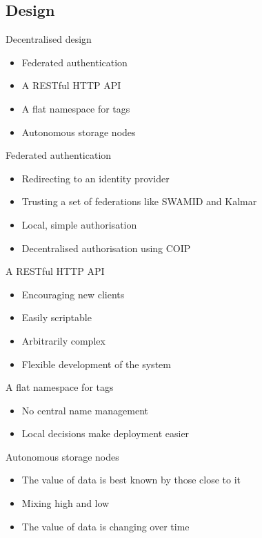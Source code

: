 \documentclass{beamer}
\begin{document}
\subsection{Design}
\begin{frame}{Decentralised design}
  \begin{itemize}
  \item
    Federated authentication
  \item
    A RESTful HTTP API
  \item
    A flat namespace for tags
  \item
    Autonomous storage nodes 
  \end{itemize}
\end{frame}
\begin{frame}{Federated authentication}
  \begin{itemize}
  \item
    Redirecting to an identity provider
  \item
    Trusting a set of federations like SWAMID and Kalmar
  \item
    Local, simple authorisation
  \item
    Decentralised authorisation using COIP
  \end{itemize}
\end{frame}

\begin{frame}{A RESTful HTTP API}
  \begin{itemize}
  \item
    Encouraging new clients
  \item
    Easily scriptable
  \item
    Arbitrarily complex
  \item
    Flexible development of the system
  \end{itemize}
\end{frame}

\begin{frame}{A flat namespace for tags}
  \begin{itemize}
  \item
    No central name management
  \item
    Local decisions make deployment easier
  \end{itemize}
\end{frame}

\begin{frame}{Autonomous storage nodes}
  \begin{itemize}
  \item
    The value of data is best known by those close to it
  \item
    Mixing high and low
  \item
    The value of data is changing over time
  \end{itemize}
\end{frame}
\end{document}
